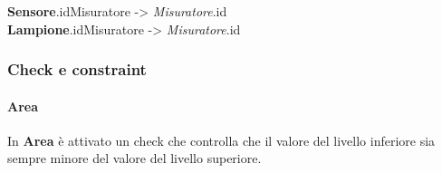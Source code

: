 \textbf{Sensore}.idMisuratore -> \textit{Misuratore}.id \\
\textbf{Lampione}.idMisuratore -> \textit{Misuratore}.id

\subsubsection{Check e constraint}

\paragraph{Area} In \textbf{Area} è attivato un check che controlla che il valore del livello inferiore sia sempre minore del valore del livello superiore.
